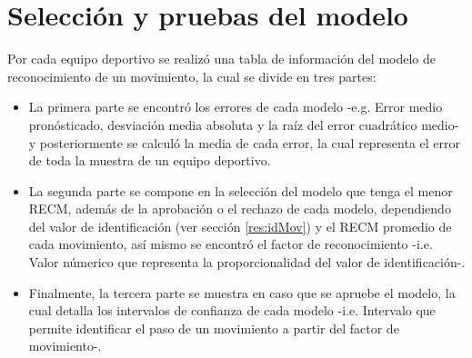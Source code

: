 \section{Selecci\'on y pruebas del modelo} \label{res:chooseModel}
Por cada equipo deportivo se realiz\'o una tabla de informaci\'on del modelo de reconocimiento de un movimiento, la cual se divide en tres partes:
\begin{itemize}
\item  La primera parte se encontr\'o los errores de cada modelo -e.g. Error medio pron\'osticado, desviaci\'on media absoluta y la ra\'iz del error cuadr\'atico medio- y posteriormente se calcul\'o la media de cada error, la cual representa el error de toda la muestra de un equipo deportivo.
\item  La segunda parte se compone en la selecci\'on del modelo que tenga el menor RECM, adem\'as de la aprobaci\'on o el rechazo de cada modelo, dependiendo del valor de identificaci\'on (ver secci\'on \ref{res:idMov}) y el RECM promedio de cada movimiento, as\'i mismo se encontr\'o el factor de reconocimiento  -i.e. Valor n\'umerico que representa la proporcionalidad del valor de identificaci\'on-.
\item Finalmente, la tercera parte se muestra en caso que se apruebe el modelo, la cual detalla los intervalos de confianza de cada modelo -i.e. Intervalo que permite identificar el paso de un movimiento a partir del factor de movimiento-.
\end{itemize}
